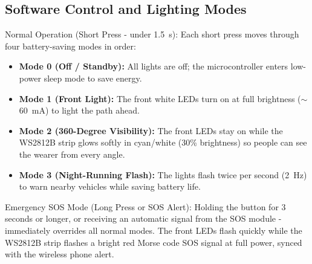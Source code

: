 \subsection{Software Control and Lighting Modes} %
Normal Operation (Short Press \-- under 1.5~s): Each short press moves through four battery-saving modes in order:
\begin{itemize}[label=--]
    \item \textbf{Mode 0 (Off / Standby):} All lights are off; the microcontroller enters low-power sleep mode to save energy.
    \item \textbf{Mode 1 (Front Light):} The front white LEDs turn on at full brightness ($\sim$60~mA) to light the path ahead.
    \item \textbf{Mode 2 (360-Degree Visibility):} The front LEDs stay on while the WS2812B strip glows softly in cyan/white (30\% brightness) so people can see the wearer from every angle.
    \item \textbf{Mode 3 (Night-Running Flash):} The lights flash twice per second (2~Hz) to warn nearby vehicles while saving battery life.
\end{itemize}

Emergency SOS Mode (Long Press or SOS Alert): Holding the button for 3 seconds or longer, or receiving an automatic signal from the SOS module \-- immediately overrides all normal modes. The front LEDs flash quickly while the WS2812B strip flashes a bright red Morse code SOS signal at full power, synced with the wireless phone alert.